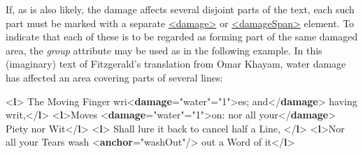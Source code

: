If, as is also likely, the damage affects several disjoint parts of the text, each such part must be marked with a separate \hyperref[TEI.damage]{<damage>} or \hyperref[TEI.damageSpan]{<damageSpan>} element. To indicate that each of these is to be regarded as forming part of the same damaged area, the {\itshape group} attribute may be used as in the following example. In this (imaginary) text of Fitzgerald's translation from Omar Khayam, water damage has affected an area covering parts of several lines: \par\bgroup{}\exampleFont \begin{shaded}\noindent\mbox{}{<\textbf{l}>} The Moving Finger wri{<\textbf{damage}\hspace*{1em}{agent}="{water}"\hspace*{1em}{group}="{1}">}es; and{</\textbf{damage}>} having writ,{</\textbf{l}>}\mbox{}\newline 
{<\textbf{l}>}Moves {<\textbf{damage}\hspace*{1em}{agent}="{water}"\hspace*{1em}{group}="{1}">}on: nor all your{</\textbf{damage}>} Piety nor\mbox{}\newline 
 Wit{</\textbf{l}>}\mbox{}\newline 
{<\textbf{l}>}\mbox{}\newline 
{}Shall lure it back to\mbox{}\newline 
 cancel half a Line,\mbox{}\newline 
{</\textbf{l}>}\mbox{}\newline 
{<\textbf{l}>}Nor all your Tears wash {<\textbf{anchor}\hspace*{1em}{xml:id}="{washOut}"/>} out a Word of it{</\textbf{l}>}\end{shaded}\egroup\par \par
